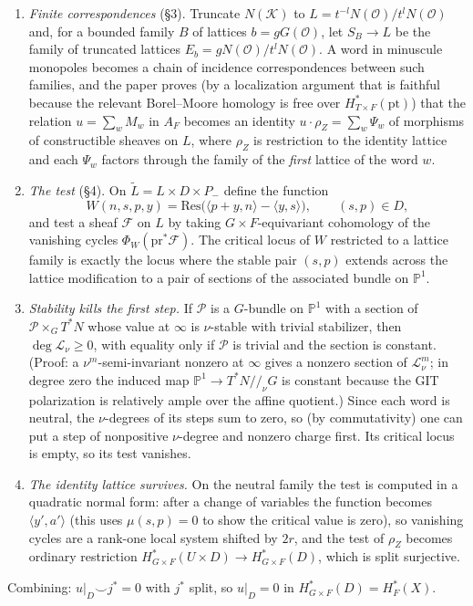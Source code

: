 \documentclass[11pt]{amsart}
\theoremstyle{remark}
\newcommand{\PP}{\mathbb{P}}
\newcommand{\OO}{\mathcal{O}}
\newcommand{\KK}{\mathcal{K}}
\newcommand{\Hc}{H^*_F(X)}
\begin{document}
\begin{enumerate}[leftmargin=2em]
\item \emph{Finite correspondences} (\S3).  Truncate $N(\KK)$ to
$L=t^{-l}N(\OO)/t^lN(\OO)$ and, for a bounded family $B$ of lattices
$b=gG(\OO)$, let $S_B\to L$ be the family of truncated lattices
$E_b=gN(\OO)/t^lN(\OO)$.  A word in minuscule monopoles becomes a chain of
incidence correspondences between such families, and the paper proves
(by a localization argument that is faithful because the relevant
Borel--Moore homology is free over $H^*_{T\times F}(\mathrm{pt})$) that the
relation $u=\sum_w M_w$ in $A_F$ becomes an identity
$u\cdot\rho_Z=\sum_w\Psi_w$ of morphisms of constructible sheaves on $L$,
where $\rho_Z$ is restriction to the identity lattice and each $\Psi_w$
factors through the family of the \emph{first} lattice of the word $w$.
\item \emph{The test} (\S4).  On $\widetilde L=L\times D\times P_-$ define
the function
\[
 W(n,s,p,y)=\mathrm{Res}\big(\langle p+y,n\rangle-\langle y,s\rangle\big),
 \qquad (s,p)\in D,
\]
and test a sheaf $\mathcal F$ on $L$ by taking $G\times F$-equivariant
cohomology of the vanishing cycles $\Phi_W(\mathrm{pr}^*\mathcal F)$.  The
critical locus of $W$ restricted to a lattice family is exactly the locus
where the stable pair $(s,p)$ extends across the lattice modification to a
pair of sections of the associated bundle on $\PP^1$.
\item \emph{Stability kills the first step.}  If $\mathcal P$ is a
$G$-bundle on $\PP^1$ with a section of $\mathcal P\times_G T^*N$ whose
value at $\infty$ is $\nu$-stable with trivial stabilizer, then
$\deg\mathcal L_\nu\ge0$, with equality only if $\mathcal P$ is trivial
and the section is constant.  (Proof: a $\nu^m$-semi-invariant nonzero at
$\infty$ gives a nonzero section of $\mathcal L_\nu^{m}$; in degree zero
the induced map $\PP^1\to T^*N/\!/_\nu G$ is constant because the GIT
polarization is relatively ample over the affine quotient.)  Since each
word is neutral, the $\nu$-degrees of its steps sum to zero, so (by
commutativity) one can put a step of nonpositive $\nu$-degree and nonzero
charge first.  Its critical locus is empty, so its test vanishes.
\item \emph{The identity lattice survives.}  On the neutral family the test
is computed in a quadratic normal form: after a change of variables the
function becomes $\langle y',a'\rangle$ (this uses $\mu(s,p)=0$ to show the
critical value is zero), so vanishing cycles are a rank-one local system
shifted by $2r$, and the test of $\rho_Z$ becomes ordinary restriction
$H^*_{G\times F}(U\times D)\to H^*_{G\times F}(D)$, which is split surjective.
\end{enumerate}
Combining: $u|_D\smile j^*=0$ with $j^*$ split, so $u|_D=0$ in
$H^*_{G\times F}(D)=\Hc$.
\end{document}
